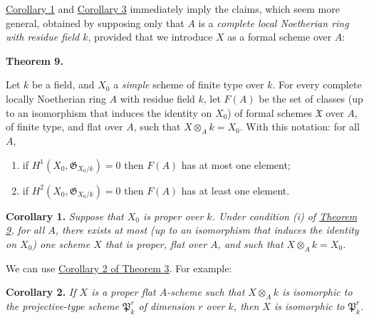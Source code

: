 \documentclass{article}
\providecommand{\tightlist}{%
  \setlength{\itemsep}{0pt}\setlength{\parskip}{0pt}}
\newenvironment{itenv}[1]
  {\phantomsection\par\smallskip\noindent\textbf{#1.}\itshape}
  {\par\smallskip}
\newcommand{\oldpage}[1]{\marginpar{\footnotesize$\Big\vert$ \textit{p.~#1}}}
\theoremstyle{definition}
\theoremstyle{definition}
\theoremstyle{definition}
\theoremstyle{definition}
\theoremstyle{remark}
\begin{document}
\protect\hyperlink{fga-2-theorem-8-corollary-1}{Corollary 1} and \protect\hyperlink{fga-2-theorem-8-corollary-3}{Corollary 3} immediately imply the claims, which seem more general, obtained by supposing only that \(A\) is a \emph{complete local Noetherian ring with residue field \(k\)}, provided that we introduce \(X\) as a formal scheme over \(A\):

\hypertarget{fga-2-theorem-9}{}
\begin{itenv}{Theorem 9}

Let \(k\) be a field, and \(X_0\) a \emph{simple} scheme of finite type over \(k\).
For every complete locally Noetherian ring \(A\) with residue field \(k\), let \(F(A)\) be the set of classes (up to an isomorphism that induces the identity on \(X_0\)) of formal schemes \({\mathfrak{X}}\) over \(A\), of finite type, and flat over \(A\), such that \(X\otimes_Ak=X_0\).
\oldpage{182-14}With this notation:
for all \(A\),

\begin{enumerate}
\def\labelenumi{\roman{enumi}.}
\tightlist
\item
  if \(H^1(X_0,{\mathfrak{G}}_{X_0/k})=0\) then \(F(A)\) has at most one element;
\item
  if \(H^2(X_0,{\mathfrak{G}}_{X_0/k})=0\) then \(F(A)\) has at least one element.
\end{enumerate}

\end{itenv}

\leavevmode{}%
\begin{itenv}{Corollary 1}
Suppose that \(X_0\) is proper over \(k\).
Under condition (i) of \protect\hyperlink{fga-2-theorem-9}{Theorem 9}, for all \(A\), there exists at most (up to an isomorphism that induces the identity on \(X_0\)) one scheme \(X\) that is proper, flat over \(A\), and such that \(X\otimes_Ak=X_0\).

\end{itenv}

We can use \protect\hyperlink{fga-2-theorem-3-corollary-2}{Corollary 2 of Theorem 3}.
For example:

\leavevmode{}%
\begin{itenv}{Corollary 2}
If \(X\) is a proper flat \(A\)-scheme such that \(X\otimes_Ak\) is isomorphic to the projective-type scheme \({\mathfrak{P}}_k^r\) of dimension \(r\) over \(k\), then \(X\) is isomorphic to \({\mathfrak{P}}_k^r\).

\end{itenv}
\end{document}
